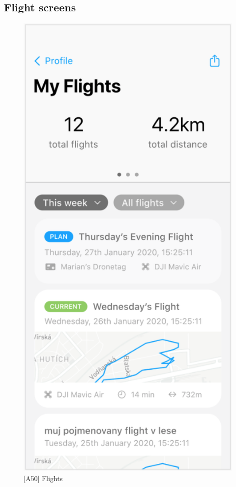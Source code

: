 \subsection{Flight screens}\label{subsec:flight-screens}


\begin{figure}
    \centering
    \begin{minipage}{.45\textwidth}
        \centering
        \includegraphics[width=.7\linewidth]{assets/user_interface_design/flight/flights.png}
        \caption{[A50] Flights}
        \label{fig:flights}
    \end{minipage}%
    \hspace{.05\linewidth}
    \begin{minipage}{.45\textwidth}
        \centering

\end{minipage}
\end{figure}
